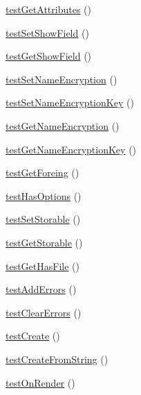 \begin{DoxyCompactItemize}
\item 
\hyperlink{class_element_test_aa3715e2191c6f99c926f1af9fa784eb5}{testGetAttributes} ()
\item 
\hyperlink{class_element_test_ac411fc625bf192b6fd8e850115eb8f25}{testSetShowField} ()
\item 
\hyperlink{class_element_test_a02c172c1ee9b7406de84b3cfeb68e75c}{testGetShowField} ()
\item 
\hyperlink{class_element_test_aab0c54c37022421730b2d3c0f2b65c72}{testSetNameEncryption} ()
\item 
\hyperlink{class_element_test_ae591f8ca3247335c6028b01c883592c3}{testSetNameEncryptionKey} ()
\item 
\hyperlink{class_element_test_aca615966ec942ed98964607789fc499a}{testGetNameEncryption} ()
\item 
\hyperlink{class_element_test_a3c513ba39c243a7eb1648fb05e54e3de}{testGetNameEncryptionKey} ()
\item 
\hyperlink{class_element_test_a9fd07f659e5e8b9f29f9f9e469929162}{testGetForeing} ()
\item 
\hyperlink{class_element_test_a1a4878cea5b79a834f2c9afc4721a361}{testHasOptions} ()
\item 
\hyperlink{class_element_test_a5b6a6d2555cf80fb9dc8ed12e1fe2260}{testSetStorable} ()
\item 
\hyperlink{class_element_test_a42f6d727065d9cd644b43c63049fc6a3}{testGetStorable} ()
\item 
\hyperlink{class_element_test_acae51e330f3a5077cdeaccddf5473f94}{testGetHasFile} ()
\item 
\hyperlink{class_element_test_a352e9d06ff4408b8a3c991f21c70722e}{testAddErrors} ()
\item 
\hyperlink{class_element_test_a8e813e63186370156c7aca5763fbd684}{testClearErrors} ()
\item 
\hyperlink{class_element_test_a9842d425e801b4ff5633ad4c24bfc359}{testCreate} ()
\item 
\hyperlink{class_element_test_a3cad92cb6bdb781785d7a04444d6fd6e}{testCreateFromString} ()
\item 
\hyperlink{class_element_test_a4e08951cd939e547553c08ee5290ac1f}{testOnRender} ()
\end{DoxyCompactItemize}

